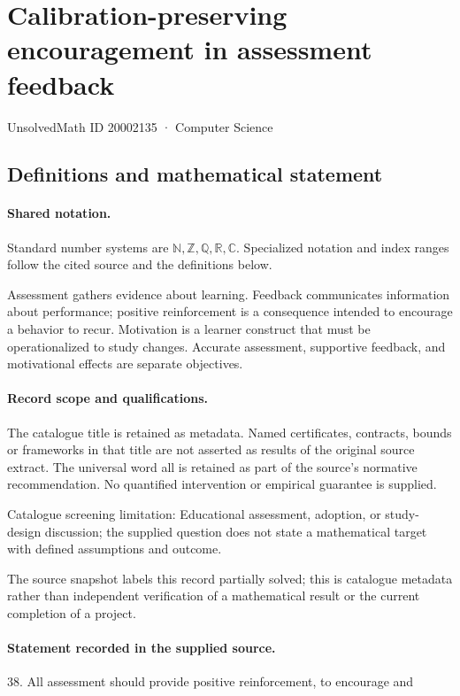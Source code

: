 \documentclass[11pt]{article}
\begin{document}
\setcounter{section}{20002134}
\section{Calibration-preserving encouragement in assessment feedback}\label{20002135}
{\small\sffamily UnsolvedMath ID 20002135 · Computer Science}
\subsection{Definitions and mathematical statement}

\paragraph{Shared notation.}Standard number systems are $\mathbb N,\mathbb Z,\mathbb Q,\mathbb R,\mathbb C$. Specialized notation and index ranges follow the cited source and the definitions below.


Assessment gathers evidence about learning. Feedback communicates information about performance; positive reinforcement is a consequence intended to encourage a behavior to recur. Motivation is a learner construct that must be operationalized to study changes. Accurate assessment, supportive feedback, and motivational effects are separate objectives.
\paragraph{Record scope and qualifications.}
The catalogue title is retained as metadata. Named certificates, contracts, bounds or frameworks in that title are not asserted as results of the original source extract.
The universal word all is retained as part of the source's normative recommendation. No quantified intervention or empirical guarantee is supplied.

Catalogue screening limitation: Educational assessment, adoption, or study-design discussion; the supplied question does not state a mathematical target with defined assumptions and outcome.

The source snapshot labels this record partially solved; this is catalogue metadata rather than independent verification of a mathematical result or the current completion of a project.
\paragraph{Statement recorded in the supplied source.}
38. All assessment should provide positive reinforcement, to encourage and
\end{document}
